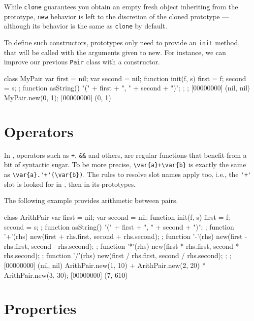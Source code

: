 While \lstinline{clone} guarantees you obtain an empty fresh object
inheriting from the prototype, \lstinline{new} behavior is left to the
discretion of the cloned prototype --- although its behavior is the same as
\lstinline{clone} by default.

To define such constructors, prototypes only need to provide an
\lstinline{init} method, that will be called with the arguments given to
new. For instance, we can improve our previous \lstinline{Pair} class with a
constructor.

\begin{urbiscript}[firstnumber=1]
class MyPair
{
  var first = nil;
  var second = nil;
  function init(f, s) { first = f;   second = s;  };
  function asString() { "(" + first + ", " + second + ")"; };
};
[00000000] (nil, nil)
MyPair.new(0, 1);
[00000000] (0, 1)
\end{urbiscript}

\section{Operators}
\label{sec:tut:operators}

In \us, operators such as \lstinline|+|, \lstinline|&&| and others, are
regular functions that benefit from a bit of syntactic sugar.  To be more
precise, \lstinline|\var{a}+\var{b}| is exactly the same as
\lstinline|\var{a}.'+'(\var{b})|.  The rules to resolve slot names apply
too, i.e., the \lstinline|'+'| slot is looked for in , then in its
prototypes.

The following example provides arithmetic between pairs.

\begin{urbiscript}
class ArithPair
{
  var first = nil;
  var second = nil;
  function init(f, s) { first = f;   second = s;  };
  function asString() { "(" + first + ", " + second + ")"; };
  function '+'(rhs) { new(first + rhs.first, second + rhs.second); };
  function '-'(rhs) { new(first - rhs.first, second - rhs.second); };
  function '*'(rhs) { new(first * rhs.first, second * rhs.second); };
  function '/'(rhs) { new(first / rhs.first, second / rhs.second); };
};
[00000000] (nil, nil)
ArithPair.new(1, 10) + ArithPair.new(2, 20) * ArithPair.new(3, 30);
[00000000] (7, 610)
\end{urbiscript}

\section{Properties}
\label{sec:tut:prop}

